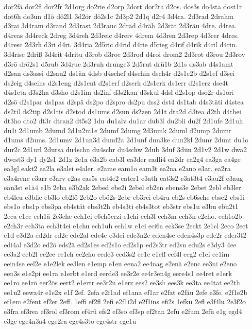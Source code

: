 {dor2fä
dor2fl
dor2fr
2d1org
do2rie
d2orp
2dort
dor2ta
d2os.
dos3s
do4sta
dost1r
dot6h
do3un
d1ö
dö2l1
3d2ör
dö2s1c
2d3p2
2d1q
d2r4
3d4ra.
2d3rad
2drahm
d3rai
3d4ram
d3rand
2d3rast
2d3rauc
2dräd
d4räh
2d3rät
2d3räu
4dre.
d4rea.
d4reas
3d4reck
2dreg
3d4reh
2d3reic
d4reiv
4drem
4d3ren
2d3rep
4d3rer
4dres.
d4resc
2d3rh
d3ri
d4ri.
3d4ria
2d5ric
d4rid
d4rie
d5rieg
d4rif
d4rik
d4ril
d4rin.
3d4risc
2driß
3d4rit
4dritu
d3rob
d3roc
2d3rod
d4roi
drom2
2d3rot
d3rou
2d3rov
d3rö
drö2s1
d5rub
3d4ruc
2d3ruh
drunge3
2d5rut
drü1b
2d1s
ds3ab
d4s1amt
d2san
ds3assi
d2sau2
ds1än
4dsb
d4schef
d4schin
dsch4r
d2s1e2b
d2s1ef
d3sei
ds2eig
d4seins
d2s1eng
d2s1ent
d2s1erf
d2serh
d2s1erk
ds1err
d2s1erz
dse4t
d4s1eta
d3s2ha
d3sho
d2s1im
ds2inf
d3s2kan
d3skul
4dsl
d2s1op
dso2r
ds1ori
d2sö
d2s1par
ds1pas
d2spä
ds2po
d2spro
ds2pu
dss2
dst4
ds1tab
d4s3täti
d4stea
ds2til
ds2tip
d2s1tis
d2stod
ds1ums
d2sun
ds2zen
2d1t
dta2d
d3tea
d2th
d4thei
dt3ho
dto2
dt3r
dtran2
dt5s2
1du
du1alv
du1ar
dub3l
du2bli
du2f
2d1ufe
2d1uh
du1i
2d1umb
2dumd
2d1u2m1e
2dumf
2dumg
2d3umk
2duml
d2ump
2dumr
d1ums
d2ums.
2d1umv
2d1un3d
dund2a
2d1unf
dun3ke
dun2kl
2dunr
2dunt
du1o
dur2c
2d1url
2dursa
du4schn
du4schr
du4schw
2düb
3düf
3dün
2d1v2
2d1w
dwa2
dwest3
dy1
dy2s1
2d1z
2e1a
e3a2b
eab3l
ea3der
eadli4
ea2dr
ea2g4
ea3ga
ea4ge
ea3gl
eakt2
ea2la
e3alei
e4aler.
e2ame
eam1o
eam3t
ea2na
e2ano
e3ar.
ea2ra
e3a4rene
e3arr
e3arv
e2as
eas5s
eat4e2
eater1
e3ath
eat3s2
e3at3t4
e3au2f
e3aug
eau3st
e1ä4
e1b
2eba
e3b2ak
2ebed
ebe2i
2ebel
eb2en
ebens3e
2ebet
2ebl
eb3ler
eb4leu
e3blie
eb3lo
eb2lö
2eb2o
ebö2s
2ebr
eb3rei
eb4ru
eb2s
eb6sche
ebse2
ebs1i
ebs1o
ebs1p
ebs3pa
eb4stät
ebs3t2h
eb4s3ti
eb4s3tot
eb3str
ebs1u
e3bu
ebu2t1
2eca
e1ce
ech1ä
2e3che
ech1ei
e6ch5erzi
e1chi
ech3l
ech3m
ech3n
e2cho.
ech1o2b
e2ch3r
ech3ta
ech3t4ei
e1chu
ech1uh
ech1w
e1ci
eci6a
eck3se
2eckt
2e1cl
2eco
2ect
e1d
e3d2a
ed2dr
ed2e
ede2al
ede4c
e3dei
ede3n2e
eden4se
eden4s3p
ede2r
eder3t2
edi4al
e3d2o
ed2ö
eds2ä
ed2s1es
ed2s1o
ed2s1p
ed2s3tr
ed2su
edu2s
e3dy3
4ee
ee3a2
eeb2l
ee2ce
ee1ch
ee2cho
eede3
eed3s2
ee1e
e1eff
eef4l
eeg2
e1ei
ee1im
eein4se
eel2e
e1e2lek
ee3len
e1emp
e1en
eena2
ee4nag
e2enä
e2enc
ee3ni
e2eno
een3s
e1e2pi
ee1ra
e1erbt
e1erd
eerde3
ee3r2e
ee4r3en4g
eere4s1
ee4ret
e1erk
ee1ro
ee1rö
eer2ös
eert2
e1ertr
ee3r2u
e1erz
ees2
ee3sh
ees3k
ee3ta
ee4tat
ee2th
ee1u2
eewa4r
e1e2x
e1f
2ef.
2efa
e2f1ad
ef1ana
ef1ar
e2fat
e2fäu
2efe
e3fe.
e2f1e2b
ef1em
e2fent
ef2er
2eff.
1effi
ef2fl
2efi
e2f1i2d
e2f1ins
efi2s
1efku
2efl
e3f4lu
2e3f2o
e3fra
ef3rea
ef3rol
ef3rom
ef4rü
efs2
ef3so
ef3sp
ef2tan
2efu
e2fum
2efü
e1g
egd4
e3ge
ege4n3a4
ege2ra
ege4s3to
ege4str
ege1u
}
